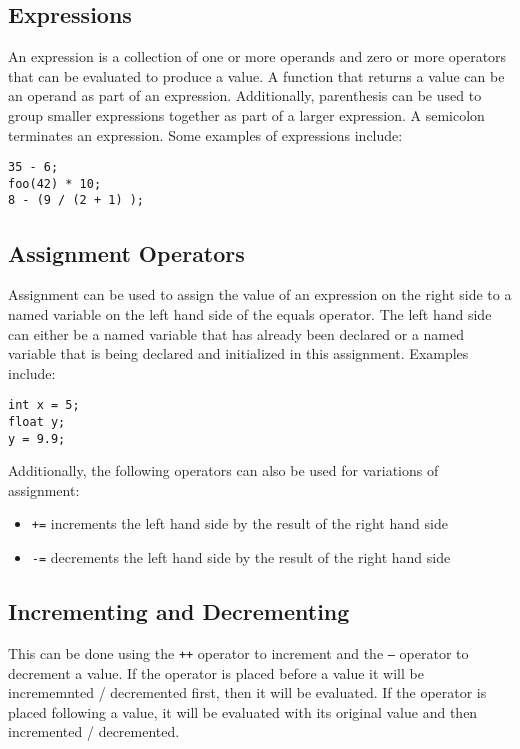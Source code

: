 \documentclass{article}
\begin{document}
\subsection{Expressions}
An expression is a collection of one or more operands and zero or more operators that can be evaluated to produce a value.  A function that returns a value can be an operand as part of an expression.  Additionally, parenthesis can be used to group smaller expressions together as part of a larger expression.  A semicolon terminates an expression.  Some examples of expressions include:
\begin{lstlisting}
35 - 6;
foo(42) * 10;
8 - (9 / (2 + 1) );
\end{lstlisting}

\subsection{Assignment Operators}
Assignment can be used to assign the value of an expression on the right side to a named variable on the left hand side of the equals operator.  The left hand side can either be a named variable that has already been declared or a named variable that is being declared and initialized in this assignment.  Examples include:
\begin{lstlisting}
int x = 5;
float y;
y = 9.9;
\end{lstlisting}

Additionally, the following operators can also be used for variations of assignment:

\begin{itemize}
\item \texttt{+=} increments the left hand side by the result of the right hand side
\item \texttt{-=} decrements the left hand side by the result of the right hand side
\end{itemize}

\subsection{Incrementing and Decrementing}
This can be done using the \texttt{++} operator to increment and the \texttt{--} operator to decrement a value.  If the operator is placed before a value it will be incrememnted / decremented first, then it will be evaluated.  If the operator is placed following a value, it will be evaluated with its original value and then incremented / decremented.
\end{document}
